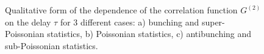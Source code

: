 \begin{figure}
\centering



\caption{Qualitative form of the dependence of the correlation function $G^{(2)}$ on the delay
  $\tau$ for 3 different cases: a) bunching and
  super-Poissonian statistics, b) Poissonian statistics, c)
  antibunching and sub-Poissonian statistics. }
\label{figPart3Nonclass3}
\end{figure}